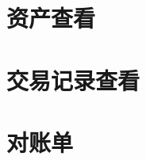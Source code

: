 
\section{资产查看} 
\label{sec:trade_record_cap}


\section{交易记录查看} 
\label{sec:trade_record_check}


\section{对账单} 
\label{sec:trade_record_list}

